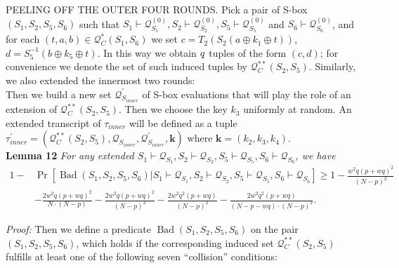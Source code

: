 \noindent
\textsc{PEELING OFF THE OUTER FOUR ROUNDS}. Pick a pair of S-box $(S_1, S_2, S_{5}, S_6)$ such that $S_{1} \vdash \mathcal{Q}_{S_{1}}^{(0)}, S_{2} \vdash \mathcal{Q}_{S_{2}}^{(0)}, S_{5} \vdash \mathcal{Q}_{S_{5}}^{(0)}$   and $S_{6} \vdash \mathcal{Q}_{S_{6}}^{(0)}$, and for each $ (t, a, b) \in \mathcal{Q}_{C}^{*}\left(S_{1}, S_{6}\right)$ we set $c=T_{2}\left(S_{2}\left(a \oplus k_{1} \oplus t\right)\right)$, $d=S_{5}^{-1}\left(b \oplus k_{5} \oplus t\right)$. In this way we obtain $\mathnormal{q}$ tuples of the form $(c, d)$; for convenience we denote the set of such induced tuples by $\mathcal{Q}_{C}^{**}\left(S_{2}, S_{5}\right)$. Similarly, we also extended the innermost two rounds:\\

Then we build a new set $\mathcal{Q}_{S_{inner}}^{\prime}$ of S-box evaluations that will play the role of an extension of $\mathcal{Q}_{C}^{**}\left(S_{2}, S_{5}\right)$. Then we choose the key $k_3$ uniformly at random. An extended transcript of $\tau_{inner}$ will be defined as a tuple $\tau_{inner}^{\prime}=\left(\mathcal{Q}_{C}^{**}\left(S_{2}, S_{5}\right), \mathcal{Q}_{S_{inner}}, \mathcal{Q}_{S_{inner}}^{\prime}, \mathbf{k}\right)$ where $\mathbf{k}=\left(k_{2}, k_{3}, k_{4}\right)$.\\

\noindent \textbf{Lemma 12} \emph{ For any extended $S_{1} \vdash \mathcal{Q}_{S_{1}}, S_{2} \vdash \mathcal{Q}_{S_{2}}, S_{5} \vdash \mathcal{Q}_{S_{5}}, S_{6} \vdash \mathcal{Q}_{S_{6}}$, we have}
\begin{equation}
\begin{aligned}
1-&\operatorname{Pr}\left[\operatorname{Bad}\left(S_{1}, S_2, S_{5}, S_6\right) | S_{1} \vdash \mathcal{Q}_{S_{1}}, S_{2} \vdash \mathcal{Q}_{S_{2}}, S_{5} \vdash \mathcal{Q}_{S_{5}}, S_{6} \vdash \mathcal{Q}_{S_{6}}\right] \geq 1- \frac{w^{2} q (p+w q)^{2}}{(N-p)^{2}}\\
& -\frac{2 w^{2} q (p+w q)^{2}}{N \cdot (N-p)} - \frac{2 w^{2} q (p+w q)^{2}}{(N-p)^2} - \frac{2 w^{2} q^{2} (p+w q)}{(N-p)^2} - \frac{2 w^{2} q^{2} (p+w q)}{(N- p- wq) \cdot (N-p)^2}.
\end{aligned}
\end{equation}

\noindent \emph{Proof:} Then we define a predicate $\operatorname{Bad}\left(S_{1}, S_2, S_{5}, S_6\right)$ on the pair $(S_1,S_2, S_5, S_6)$, which holds if the corresponding induced set $\mathcal{Q}_{C}^{**}\left(S_{2}, S_{5}\right)$ fulfills at least one of the following seven ``collision'' conditions:

